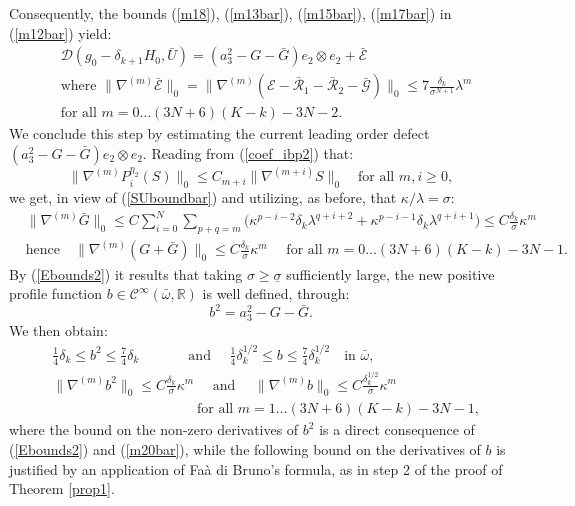 \documentclass[reqno,twoside,11pt]{amsart}
\newcommand{\R}{\mathbb{R}}
\numberwithin{equation}{section}
\theoremstyle{plain}
\theoremstyle{definition}
\begin{document}
Consequently, the bounds (\ref{m18}), (\ref{m13bar}), 
(\ref{m15bar}), (\ref{m17bar}) in (\ref{m12bar}) yield:
\begin{equation}\label{m18bar}
\begin{split}
& \mathcal{D}(g_0-\delta_{k+1}H_0, \bar U) = (a_3^2-G - \bar G) e_2\otimes e_2
+ \bar{\mathcal{E}}\\
& \mbox{where } \|\nabla^{(m)}\bar{\mathcal{E}}\|_0 =
\|\nabla^{(m)}(\mathcal{E} - \bar{\mathcal{R}}_1 - \bar{\mathcal{R}}_2- \bar{\mathcal{G}})\|_0
\leq 7\frac{\delta_k}{\sigma^{N+1}}\lambda^m \\ &
\mbox{for all } m=0\ldots (3N+6)(K-k)-3N-2.
\end{split}
\end{equation}
We conclude this step by estimating the current leading order defect
$(a_3^2-G - \bar G) e_2\otimes e_2$. Reading from (\ref{coef_ibp2}) that:
\begin{equation*}
\|\nabla^{(m)}P_i^{\eta_2}(S)\|_0\leq
C_{m+i}\|\nabla^{(m+i)}S\|_0\quad\mbox{for all } m,i\geq 0,
\end{equation*}
we get, in view of (\ref{SUboundbar}) and utilizing, as before, that $\kappa/\lambda=\sigma$:
\begin{equation}\label{m20bar}
\begin{split}
& \|\nabla^{(m)}\bar G\|_0  \leq C\sum_{i=0}^N\sum_{p+q=m}\Big(\kappa^{p-i-2}\delta_k\lambda^{q+i+2}
+ \kappa^{p-i-1}\delta_k\lambda^{q+i+1}\Big) \leq
C\frac{\delta_k}{\sigma}\kappa^m\\ & \mbox{hence}\quad \|\nabla^{(m)}(G+\bar G)\|_0  \leq
C\frac{\delta_k}{\sigma}\kappa^m 
\quad \mbox{ for all } m=0\ldots (3N+6)(K-k)-3N-1.
\end{split}
\end{equation}
By (\ref{Ebounds2}) it results that taking $\sigma\geq \underline\sigma $ sufficiently large, 
the new positive profile function
$b\in\mathcal{C}^\infty(\bar\omega,\R)$ is well defined, through:
$$b^2 = a_3^2-G - \bar G.$$
We then obtain:
\begin{equation}\label{Ebounds2b}
\begin{split}
& \frac{1}{4}\delta_k\leq b^2\leq \frac{7}{4}\delta_k
\qquad\quad \, \mbox{ and } \quad \frac{1}{4}\delta_k^{1/2}\leq b\leq \frac{7}{4}\delta_k^{1/2}
\quad \mbox{in }\bar\omega, \\
& \|\nabla^{(m)} b^2\|_0\leq C\frac{\delta_k}{\sigma}\kappa^{m} \quad\mbox{ and } \quad 
\|\nabla^{(m)} b\|_0\leq C\frac{\delta_k^{1/2}}{\sigma}\kappa^{m}
\\ &   \qquad\qquad\qquad\qquad \qquad\mbox{ for all } m=1\ldots (3N+6)(K-k)-3N-1,
\end{split}
\end{equation}
where the bound on the non-zero derivatives of $b^2$ is a direct consequence of
(\ref{Ebounds2}) and (\ref{m20bar}), while the following bound on the
derivatives of $b$ is justified by an application of Fa\`a di Bruno's
formula, as in step 2 of the proof of Theorem \ref{prop1}.
\end{document}
